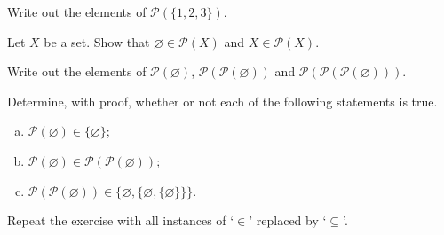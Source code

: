 \begin{exercise}
Write out the elements of $\mathcal{P}(\{1, 2, 3\})$.
\end{exercise}

\begin{exercise}
Let $X$ be a set. Show that $\varnothing \in \mathcal{P}(X)$ and $X \in \mathcal{P}(X)$.
\end{exercise}

\begin{exercise}
Write out the elements of $\mathcal{P}(\varnothing)$, $\mathcal{P}(\mathcal{P}(\varnothing))$ and $\mathcal{P}(\mathcal{P}(\mathcal{P}(\varnothing)))$.
\end{exercise}


\begin{exercise}
Determine, with proof, whether or not each of the following statements is true.
\begin{enumerate}[(a)]
\item $\mathcal{P}(\varnothing) \in \{ \varnothing \}$;
\item $\mathcal{P}(\varnothing) \in \mathcal{P}(\mathcal{P}(\varnothing))$;
\item $\mathcal{P}(\mathcal{P}(\varnothing)) \in \{ \varnothing, \{ \varnothing, \{ \varnothing \} \} \}$.
\end{enumerate}
Repeat the exercise with all instances of `$\in$' replaced by `$\subseteq$'.
\end{exercise}